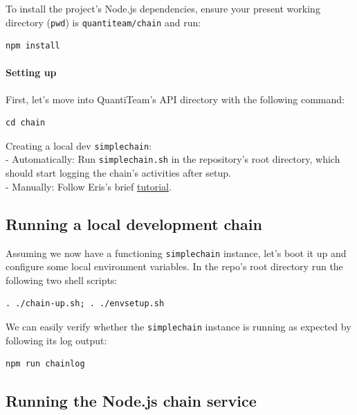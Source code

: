 To install the project's Node.js dependencies, ensure your present
working directory (\texttt{pwd}) is \texttt{quantiteam/chain} and run:

\begin{verbatim}
npm install
\end{verbatim}

\paragraph{Setting up}\label{setting-up}

First, let's move into QuantiTeam's API directory with the following
command:

\begin{verbatim}
cd chain
\end{verbatim}

Creating a local dev \texttt{simplechain}:\\
- Automatically: Run \texttt{simplechain.sh} in the repository's root
directory, which should start logging the chain's activities after
setup.\\
- Manually: Follow Eris's brief
\href{https://docs.erisindustries.com/tutorials/chain-making/}{tutorial}.

\subsection{Running a local development
chain}\label{running-a-local-development-chain}

Assuming we now have a functioning \texttt{simplechain} instance, let's
boot it up and configure some local environment variables. In the repo's
root directory run the following two shell scripts:

\begin{verbatim}
. ./chain-up.sh; . ./envsetup.sh
\end{verbatim}

We can easily verify whether the \texttt{simplechain} instance is
running as expected by following its log output:

\begin{verbatim}
npm run chainlog
\end{verbatim}

\subsection{Running the Node.js chain
service}\label{running-the-node.js-chain-service}

